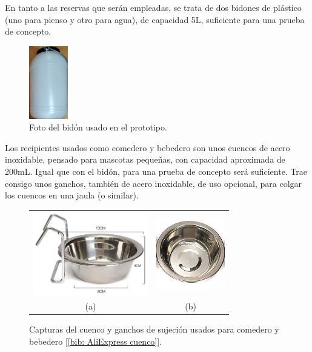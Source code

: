 \documentclass[12pt]{article}
\begin{document}
	\noindent En tanto a las reservas que serán empleadas, se trata de dos bidones de plástico (uno para pienso y otro para agua), de capacidad 5L, suficiente para una prueba de concepto. \\
	
	\pagebreak
	
	\begin{figure}[h!]
		\begin{center}
			\includegraphics[width=0.15\textwidth]{img/bidon.png}
			\caption{Foto del bidón usado en el prototipo.}
			\label{Captura bidon}
		\end{center}
	\end{figure}
	
	\noindent Los recipientes usados como comedero y bebedero son unos cuencos de acero inoxidable, pensado para mascotas pequeñas, con capacidad aproximada de 200mL. Igual que con el bidón, para una prueba de concepto será suficiente. Trae consigo unos ganchos, también de acero inoxidable, de uso opcional, para colgar los cuencos en una jaula (o similar).\\
	
	\begin{figure}[h]
		\begin{center}
			\begin{tabular}{cc}
				\includegraphics[width=50mm]{img/cuenco_1.png} &   \includegraphics[width=30mm]{img/cuenco_2.png} \\
				(a) & (b)  \\[6pt]
			\end{tabular}
			\caption{Capturas del cuenco y ganchos de sujeción usados para comedero y bebedero [\ref{bib: AliExpress cuenco}]. }
			\label{fig: capturas bebdero.}
		\end{center}
	\end{figure}
	
\end{document}

